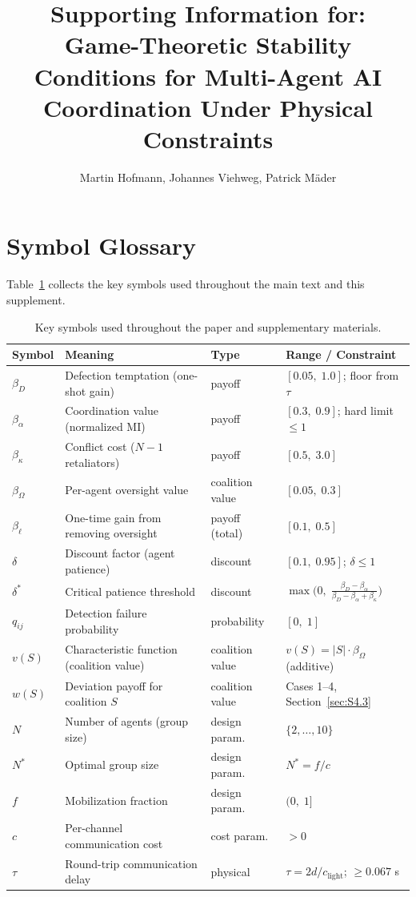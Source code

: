 \documentclass[11pt]{article}
\title{Supporting Information for:\\
Game-Theoretic Stability Conditions for Multi-Agent AI Coordination Under Physical Constraints}
\author{Martin Hofmann, Johannes Viehweg, Patrick M\"ader}
\date{}
\begin{document}
\maketitle

\tableofcontents
\bigskip


\section{Symbol Glossary}
\label{sec:S1}

Table~\ref{tab:symbols} collects the key symbols used throughout the main text and this supplement.

\begin{table}[h]
\caption{Key symbols used throughout the paper and supplementary materials.}
\label{tab:symbols}
\centering
\small
\begin{tabular}{llll}
\toprule
\textbf{Symbol} & \textbf{Meaning} & \textbf{Type} & \textbf{Range / Constraint} \\
\midrule
$\beta_D$ & Defection temptation (one-shot gain) & payoff & $[0.05,\;1.0]$; floor from $\tau$ \\
$\beta_\alpha$ & Coordination value (normalized MI) & payoff & $[0.3,\;0.9]$; hard limit $\leq 1$ \\
$\beta_\kappa$ & Conflict cost ($N{-}1$ retaliators) & payoff & $[0.5,\;3.0]$ \\
$\beta_\Omega$ & Per-agent oversight value & coalition value & $[0.05,\;0.3]$ \\
$\beta_\ell$ & One-time gain from removing oversight & payoff (total) & $[0.1,\;0.5]$ \\
$\delta$ & Discount factor (agent patience) & discount & $[0.1,\;0.95]$; $\delta \leq 1$ \\
$\delta^*$ & Critical patience threshold & discount & $\max\!\bigl(0,\;\tfrac{\beta_D-\beta_\alpha}{\beta_D-\beta_\alpha+\beta_\kappa}\bigr)$ \\
$q_{ij}$ & Detection failure probability & probability & $[0,\;1]$ \\
$v(S)$ & Characteristic function (coalition value) & coalition value & $v(S) = |S|\cdot\beta_\Omega$ (additive) \\
$w(S)$ & Deviation payoff for coalition $S$ & coalition value & Cases 1--4, Section~\ref{sec:S4.3} \\
$N$ & Number of agents (group size) & design param.\ & $\{2,\ldots,10\}$ \\
$N^*$ & Optimal group size & design param.\ & $N^* = f/c$ \\
$f$ & Mobilization fraction & design param.\ & $(0,\;1]$ \\
$c$ & Per-channel communication cost & cost param.\ & $>0$ \\
$\tau$ & Round-trip communication delay & physical & $\tau = 2d/c_{\text{light}}$; $\geq 0.067$ s \\
\bottomrule
\end{tabular}
\end{table}
\end{document}
